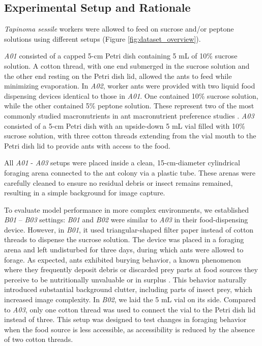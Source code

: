 \subsection{Experimental Setup and Rationale}

\emph{Tapinoma sessile} workers were allowed to feed on sucrose and/or peptone solutions using different setups (Figure \ref{fig:dataset_overview}). 

\textit{A01} consisted of a capped 5-cm Petri dish containing 5 mL of 10\% sucrose solution. A cotton thread, with one end submerged in the sucrose solution and the other end resting on the Petri dish lid, allowed the ants to feed while minimizing evaporation. In \textit{A02}, worker ants were provided with two liquid food dispensing devices identical to those in \textit{A01}. One contained 10\% sucrose solution, while the other contained 5\% peptone solution. These represent two of the most commonly studied macronutrients in ant macronutrient preference studies \cite{madsen_sugar_2017}. \textit{A03} consisted of a 5-cm Petri dish with an upside-down 5 mL vial filled with 10\% sucrose solution, with three cotton threads extending from the vial mouth to the Petri dish lid to provide ants with access to the food.

All \textit{A01} - \textit{A03} setups were placed inside a clean, 15-cm-diameter cylindrical foraging arena connected to the ant colony via a plastic tube. These arenas were carefully cleaned to ensure no residual debris or insect remains remained, resulting in a simple background for image capture. 

To evaluate model performance in more complex environments, we established \textit{B01} – \textit{B03} settings: \textit{B01} and \textit{B02} were similar to \textit{A03} in their food-dispensing device. However, in \textit{B01}, it used triangular-shaped filter paper instead of cotton threads to dispense the sucrose solution. The device was placed in a foraging arena and left undisturbed for three days, during which ants were allowed to forage. As expected, ants exhibited burying behavior, a known phenomenon where they frequently deposit debris or discarded prey parts at food sources they perceive to be nutritionally unvaluable or in surplus \cite{qin_food-burying_2019}. This behavior naturally introduced substantial background clutter, including parts of insect prey, which increased image complexity. In \textit{B02}, we laid the 5 mL vial on its side. Compared to \textit{A03}, only one cotton thread was used to connect the vial to the Petri dish lid instead of three. This setup was designed to test changes in foraging behavior when the food source is less accessible, as accessibility is reduced by the absence of two cotton threads.

